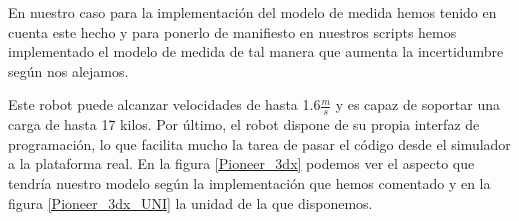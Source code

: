 En nuestro caso para la implementación del modelo de medida hemos tenido en cuenta este hecho y para ponerlo de manifiesto en nuestros scripts hemos implementado el modelo de medida de tal manera que aumenta la incertidumbre según nos alejamos.
%
%
%
%
%


Este robot puede alcanzar velocidades de hasta 1.6$\frac{m}{s}$ y es capaz de soportar una carga de hasta 17 kilos.
Por último, el robot dispone de su propia interfaz de programación, lo que facilita mucho la tarea de pasar el código desde el simulador a la plataforma real.
En la figura \ref{Pioneer_3dx} podemos ver el aspecto que tendría nuestro modelo según la implementación que hemos comentado y en la figura \ref{Pioneer_3dx_UNI} la unidad de la que disponemos.

